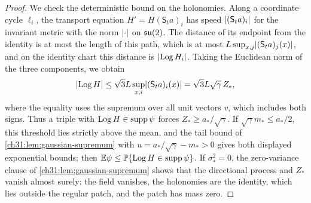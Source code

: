 \begin{proof}
We check the deterministic bound on the holonomies. Along a coordinate cycle $\ell_i$, the transport equation $H'=H(\mathsf S_ta)_i$ has speed $\lvert (\mathsf S_ta)_i\rvert$ for the invariant metric with the norm $\lvert \cdot\rvert$ on $\mathfrak{su}(2)$. The distance of its endpoint from the identity is at most the length of this path, which is at most $L\sup_{x,j}\lvert (\mathsf S_ta)_j(x)\rvert$, and on the identity chart this distance is $\lvert \operatorname{Log} H_i\rvert$. Taking the Euclidean norm of the three components, we obtain
\[
 \lvert \operatorname{Log} H\rvert\le\sqrt3L\sup_{x,i}\lvert (\mathsf S_ta)_i(x)\rvert=\sqrt3L\sqrt\gamma\,Z_*,
\]
where the equality uses the supremum over all unit vectors $v$, which includes both signs. Thus a triple with $\operatorname{Log} H\in\operatorname{supp}\psi$ forces $Z_*\ge a_*/\sqrt\gamma$. If $\sqrt\gamma m_*\le a_*/2$, this threshold lies strictly above the mean, and the tail bound of \cref{ch31:lem:gaussian-supremum} with $u=a_*/\sqrt\gamma-m_*>0$ gives both displayed exponential bounds; then $\mathbb E\psi\le\mathbb P\{\operatorname{Log} H\in\operatorname{supp}\psi\}$. If $\sigma_*^2=0$, the zero-variance clause of \cref{ch31:lem:gaussian-supremum} shows that the directional process and $Z_*$ vanish almost surely; the field vanishes, the holonomies are the identity, which lies outside the regular patch, and the patch has mass zero.


\end{proof}
